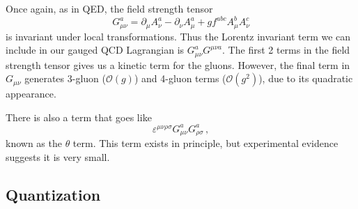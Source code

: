 \documentclass[12pt]{memoir}
\begin{document}
Once again, as in QED, the field strength tensor
\begin{equation}
  G_{\mu\nu}^a = \partial_{\mu} A_{\nu}^a - \partial_{\nu} A_{\mu}^a  + g f^{abc} A_{\mu}^b A_{\nu}^c
\end{equation}
is invariant under local transformations.
Thus the Lorentz invariant term we can include in our gauged QCD Lagrangian is $G_{\mu\nu}^a G^{\mu\nu a}$.
The first 2 terms in the field strength tensor gives us a kinetic term for the gluons.
However, the final term in $G_{\mu\nu}$ generates 3-gluon ($\mathcal{O}(g)$) and 4-gluon terms ($\mathcal{O}(g^2)$), due to its quadratic appearance.

There is also a term that goes like
\begin{equation}
  \varepsilon^{\mu\nu\rho\sigma}G_{\mu\nu}^a G_{\rho\sigma}^a \,,
\end{equation}
known as the $\theta$ term.
This term exists in principle,
but experimental evidence suggests it is very small.


\subsection{Quantization}
\end{document}
